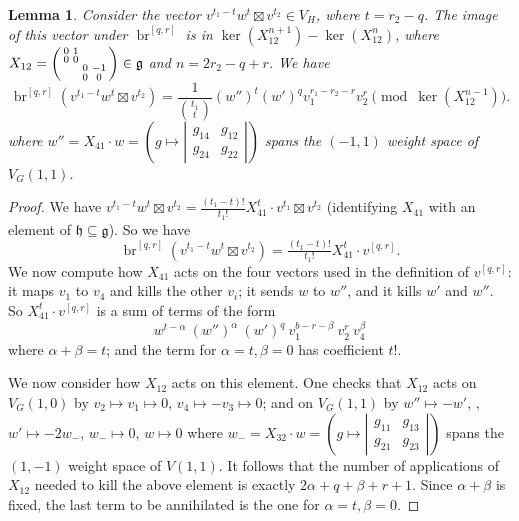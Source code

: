 \documentclass[cjm]{ipart}
\newenvironment{smatrix}{\left( \begin{smallmatrix} } {\end{smallmatrix} \right) }
\theoremstyle{plain}
\newtheorem{lemma}[theorem]{Lemma}
\theoremstyle{remark}
\DeclareMathOperator{\br}{br}
\numberwithin{equation}{subsection}
\begin{document}
   \begin{lemma}
    Consider the vector $v^{t_1 -t} w^t \boxtimes v^{t_2} \in V_H$, where $t = r_2 - q$. The image of this vector under $\br^{[q,r]}$ is in $\ker(X_{12}^{n+1}) - \ker(X_{12}^{n})$, where $X_{12} = \begin{smatrix} 0 & 1 \\ 0 & 0 \\ &&0 & -1 \\ &&0 & 0 \end{smatrix} \in \mathfrak{g}$ and $n = 2r_2 - q + r$. We have
    \[ \br^{[q,r]}\left(v^{t_1 -t} w^t \boxtimes v^{t_2}\right) = \frac{1}{\binom{t_1}{t}} (w'')^t (w')^q v_1^{r_1-r_2-r} v_2^r \pmod{\ker(X_{12}^{n-1})}. \]
    where $w'' = X_{41} \cdot w = \left(g \mapsto \left| \begin{smallmatrix} g_{14} & g_{12} \\ g_{24} & g_{22} \end{smallmatrix} \right|\right)$ spans the $(-1, 1)$ weight space of $V_G(1, 1)$.
   \end{lemma}

   \begin{proof}
    We have $v^{t_1 -t} w^t \boxtimes v^{t_2} = \tfrac{(t_1 - t)!}{t_1!} X_{41}^t \cdot v^{t_1} \boxtimes v^{t_2}$ (identifying $X_{41}$ with an element of $\mathfrak{h} \subseteq \mathfrak{g}$). So we have
    \[ \br^{[q,r]}\left(v^{t_1 -t} w^t \boxtimes v^{t_2}\right) = \tfrac{(t_1 - t)!}{t_1!} X_{41}^t \cdot v^{[q,r]}.\]
    We now compute how $X_{41}$ acts on the four vectors used in the definition of $v^{[q,r]}$: it maps $v_1$ to $v_4$ and kills the other $v_i$; it sends $w$ to $w''$, and it kills $w'$ and $w''$. So $X_{41}^t \cdot v^{[q,r]}$ is a sum of terms of the form
    \[ w^{t-\alpha}\ (w'')^\alpha\ (w')^q\ v_1^{b-r - \beta}\ v_2^r\ v_4^\beta \]
    where $\alpha + \beta = t$; and the term for $\alpha = t, \beta = 0$ has coefficient $t!$.

    We now consider how $X_{12}$ acts on this element. One checks that $X_{12}$ acts on $V_G(1, 0)$ by $v_2 \mapsto v_1 \mapsto 0$, $v_4 \mapsto -v_3 \mapsto 0$; and on $V_G(1, 1)$ by $w'' \mapsto -w'$, , $w' \mapsto -2w_-$, $w_- \mapsto 0$, $w \mapsto 0$ where $w_- = X_{32} \cdot w = \left(g \mapsto \left| \begin{smallmatrix} g_{11} & g_{13} \\ g_{21} & g_{23} \end{smallmatrix} \right|\right)$ spans the $(1, -1)$ weight space of $V(1, 1)$. It follows that the number of applications of $X_{12}$ needed to kill the above element is exactly $2\alpha + q + \beta + r + 1$. Since $\alpha + \beta$ is fixed, the last term to be annihilated is the one for $\alpha = t, \beta = 0$.
   \end{proof}
\end{document}
